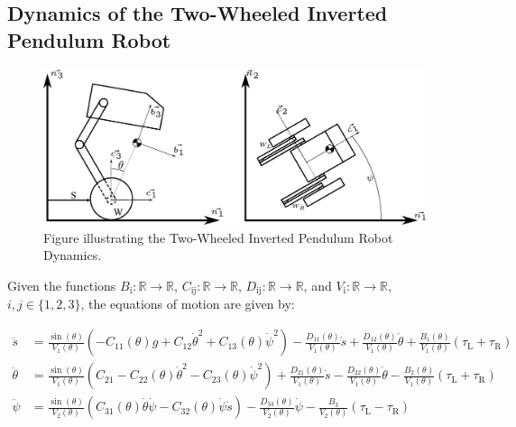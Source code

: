 \subsection{Dynamics of the Two-Wheeled Inverted Pendulum Robot}
    \begin{figure}[h]
        \centering
        \includegraphics[width=1\textwidth]{TWIPR dynamics}
        \caption[Two-Wheeled Inverted Pendulum Robot Dynamics]{Figure illustrating the Two-Wheeled Inverted Pendulum Robot Dynamics.}
        \label{fig:Two-Wheeled Inverted Pendulum Robot Dynamics}
    \end{figure}

    Given the functions $B_{\mathrm{i}}: \mathbb{R} \rightarrow \mathbb{R}$, $C_{\mathrm{ij}}: \mathbb{R} \rightarrow \mathbb{R}$, $D_{\mathrm{ij}}: \mathbb{R} \rightarrow \mathbb{R}$, and $V_{\mathrm{i}}: \mathbb{R} \rightarrow \mathbb{R}$, $i,j \in \{1,2,3\}$, the equations of motion are given by:

    \begin{align}
        \ddot{s} &= \frac{\sin(\theta)}{V_{\mathrm{1}}(\theta)} \left( -C_{\mathrm{11}}(\theta)g + C_{\mathrm{12}}\dot{\theta}^2 + C_{\mathrm{13}}(\theta)\dot{\psi}^2 \right) - \frac{D_{\mathrm{11}}(\theta)}{V_{\mathrm{1}}(\theta)}\dot{s} + \frac{D_{\mathrm{12}}(\theta)}{V_{\mathrm{1}}(\theta)}\dot{\theta} + \frac{B_{\mathrm{1}}(\theta)}{V_{\mathrm{1}}(\theta)}(\tau_{\mathrm{L}} + \tau_{\mathrm{R}}) \\
        \ddot{\theta} &= \frac{\sin(\theta)}{V_{\mathrm{1}}(\theta)} \left( C_{\mathrm{21}} - C_{\mathrm{22}}(\theta)\dot{\theta}^2 - C_{\mathrm{23}}(\theta)\dot{\psi}^2 \right) + \frac{D_{\mathrm{21}}(\theta)}{V_{\mathrm{1}}(\theta)}\dot{s} - \frac{D_{\mathrm{22}}(\theta)}{V_{\mathrm{1}}(\theta)}\dot{\theta} - \frac{B_{\mathrm{2}}(\theta)}{V_{\mathrm{1}}(\theta)}(\tau_{\mathrm{L}} + \tau_{\mathrm{R}})  \\
        \ddot{\psi} &= \frac{\sin(\theta)}{V_{\mathrm{2}}(\theta)} \left( C_{\mathrm{31}}(\theta)\dot{\theta}\dot{\psi} - C_{\mathrm{32}}(\theta)\dot{\psi}\dot{s} \right) - \frac{D_{\mathrm{33}}(\theta)}{V_{\mathrm{2}}(\theta)}\dot{\psi} - \frac{B_{\mathrm{3}}}{V_{\mathrm{2}}(\theta)}(\tau_{\mathrm{L}} - \tau_{\mathrm{R}})
    \end{align}

